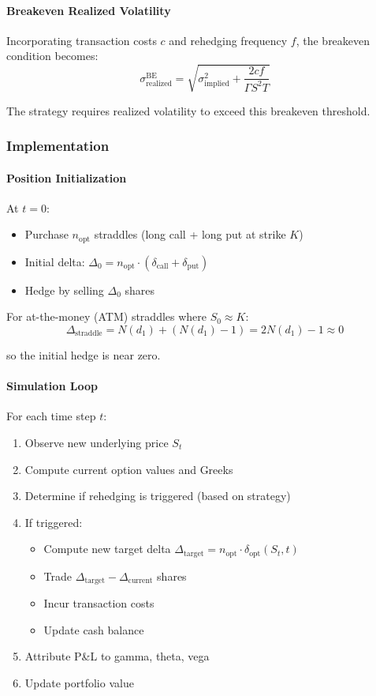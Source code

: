 \paragraph{Breakeven Realized Volatility}

Incorporating transaction costs $c$ and rehedging frequency $f$, the breakeven condition becomes:
\[
\sigma_{\text{realized}}^{\text{BE}} = \sqrt{\sigma_{\text{implied}}^2 + \frac{2cf}{\Gamma S^2 T}}
\]

The strategy requires realized volatility to exceed this breakeven threshold.

\subsubsection{Implementation}

\paragraph{Position Initialization}

At $t = 0$:
\begin{itemize}
  \item Purchase $n_{\text{opt}}$ straddles (long call + long put at strike $K$)
  \item Initial delta: $\Delta_0 = n_{\text{opt}} \cdot (\delta_{\text{call}} + \delta_{\text{put}})$
  \item Hedge by selling $\Delta_0$ shares
\end{itemize}

For at-the-money (ATM) straddles where $S_0 \approx K$:
\[
\Delta_{\text{straddle}} = N(d_1) + (N(d_1) - 1) = 2N(d_1) - 1 \approx 0
\]

so the initial hedge is near zero.

\paragraph{Simulation Loop}

For each time step $t$:
\begin{enumerate}
  \item Observe new underlying price $S_t$
  \item Compute current option values and Greeks
  \item Determine if rehedging is triggered (based on strategy)
  \item If triggered:
  \begin{itemize}
    \item Compute new target delta $\Delta_{\text{target}} = n_{\text{opt}} \cdot \delta_{\text{opt}}(S_t, t)$
    \item Trade $\Delta_{\text{target}} - \Delta_{\text{current}}$ shares
    \item Incur transaction costs
    \item Update cash balance
  \end{itemize}
  \item Attribute P\&L to gamma, theta, vega
  \item Update portfolio value
\end{enumerate}

